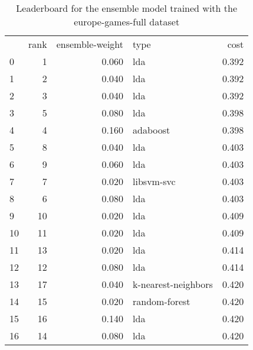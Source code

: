 \begin{table}[]
	\centering
	\begin{tabular}{lrrlr}
		   & rank & ensemble-weight & type                & cost  \\
		0  & 1    & 0.060           & lda                 & 0.392 \\
		1  & 2    & 0.040           & lda                 & 0.392 \\
		2  & 3    & 0.040           & lda                 & 0.392 \\
		3  & 5    & 0.080           & lda                 & 0.398 \\
		4  & 4    & 0.160           & adaboost            & 0.398 \\
		5  & 8    & 0.040           & lda                 & 0.403 \\
		6  & 9    & 0.060           & lda                 & 0.403 \\
		7  & 7    & 0.020           & libsvm-svc          & 0.403 \\
		8  & 6    & 0.080           & lda                 & 0.403 \\
		9  & 10   & 0.020           & lda                 & 0.409 \\
		10 & 11   & 0.020           & lda                 & 0.409 \\
		11 & 13   & 0.020           & lda                 & 0.414 \\
		12 & 12   & 0.080           & lda                 & 0.414 \\
		13 & 17   & 0.040           & k-nearest-neighbors & 0.420 \\
		14 & 15   & 0.020           & random-forest       & 0.420 \\
		15 & 16   & 0.140           & lda                 & 0.420 \\
		16 & 14   & 0.080           & lda                 & 0.420 \\
	\end{tabular}

	\caption{Leaderboard for the ensemble model trained with the europe-games-full dataset}
	\label{tab:lb-europe-games-full-randsplit}
\end{table}


